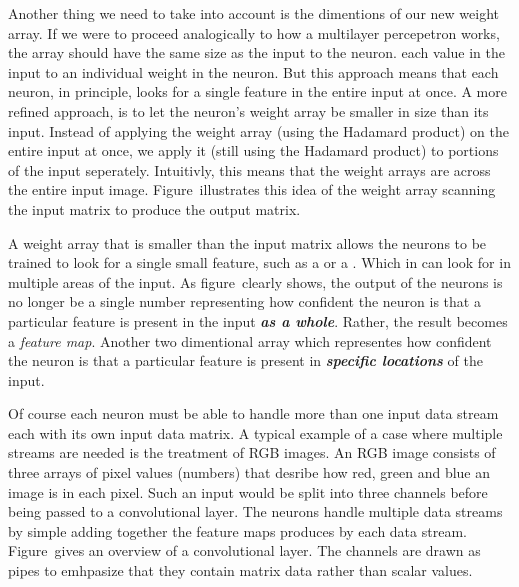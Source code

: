 Another thing we need to take into account is the dimentions of our new weight array.
If we were to proceed analogically to how a multilayer percepetron works, the array should have the same size as the input to the neuron.
 each value in the input to an individual weight in the neuron.
But this approach means that each neuron, in principle, looks for a single feature in the entire input at once.
A more refined approach, is to let the neuron's weight array be smaller in size than its input.
Instead of applying the weight array (using the Hadamard product) on the entire input at once, we apply it (still using the Hadamard product) to portions of the input seperately.
Intuitivly, this means that the weight arrays are  across the entire input image.
Figure~ illustrates this idea of the weight array scanning the input matrix to produce the output matrix.

A weight array that is smaller than the input matrix allows the neurons to be trained to look for a single small feature, such as a  or a .
Which in can look for in multiple areas of the input.
As figure~ clearly shows, the output of the neurons is no longer be a single number representing how  confident the neuron is that a particular feature is present in the input {\em\bf as a whole}.
Rather, the result becomes a {\em feature map}.
Another two dimentional array which representes how  confident the neuron is that a particular feature is present in {\em\bf specific locations} of the input.

\startplacefigure[
    reference=conv-operation,
    title={The basic forward operation of a convolutional layer~\cite[escontrela_2018].},
    location=bottom,
]
{}{}
{}{}
{}{}
{}{}
{}{}
{}{}
{}{}
{}{}
\stopcombination
\stopplacefigure

Of course each neuron must be able to handle more than one input data stream each with its own input data matrix.
A typical example of a case where multiple streams are needed is the treatment of RGB images.
An RGB image consists of three arrays of pixel values (numbers) that desribe how red, green and blue an image is in each pixel.
Such an input would be split into three channels before being passed to a convolutional layer.
The neurons handle multiple data streams by simple adding together the feature maps produces by each data stream.
Figure~\in[cv-network] gives an overview of a convolutional layer.
The channels are drawn as pipes to emhpasize that they contain matrix data rather than scalar values.

